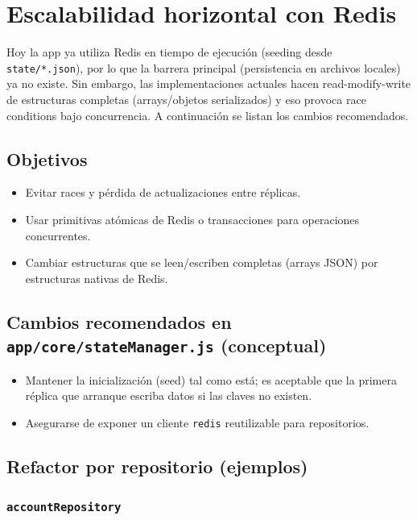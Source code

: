 
\section{Escalabilidad horizontal con Redis}

Hoy la app ya utiliza Redis en tiempo de ejecución (seeding desde \texttt{state/*.json}), por lo que la barrera principal (persistencia en archivos locales) ya no existe. Sin embargo, las implementaciones actuales hacen read-modify-write de estructuras completas (arrays/objetos serializados) y eso provoca race conditions bajo concurrencia. A continuación se listan los cambios recomendados.

\subsection{Objetivos}

\begin{itemize}[leftmargin=*]
    \item Evitar races y pérdida de actualizaciones entre réplicas.
    \item Usar primitivas atómicas de Redis o transacciones para operaciones concurrentes.
    \item Cambiar estructuras que se leen/escriben completas (arrays JSON) por estructuras nativas de Redis.
\end{itemize}

\subsection{Cambios recomendados en \texttt{app/core/stateManager.js} (conceptual)}

\begin{itemize}[leftmargin=*]
    \item Mantener la inicialización (seed) tal como está; es aceptable que la primera réplica que arranque escriba datos si las claves no existen.
    \item Asegurarse de exponer un cliente \texttt{redis} reutilizable para repositorios.
\end{itemize}

\subsection{Refactor por repositorio (ejemplos)}

\subsubsection{\texttt{accountRepository}}

